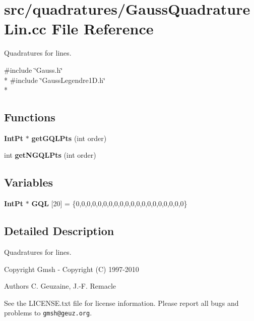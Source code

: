 \section{src/quadratures/\-Gauss\-Quadrature\-Lin.cc File Reference}
\label{GaussQuadratureLin_8cc}


Quadratures for lines.  


{\ttfamily \#include \char`\"{}Gauss.\-h\char`\"{}}\\*
{\ttfamily \#include \char`\"{}Gauss\-Legendre1\-D.\-h\char`\"{}}\\*
\subsection*{Functions}
\begin{DoxyCompactItemize}
\item 
{\bf Int\-Pt} $\ast$ {\bfseries get\-G\-Q\-L\-Pts} (int order)\label{GaussQuadratureLin_8cc_ac10710cd6e0e978c39a5e96a72d2036f}

\item 
int {\bfseries get\-N\-G\-Q\-L\-Pts} (int order)\label{GaussQuadratureLin_8cc_a79913d30c41fd4e8ca9828519704572e}

\end{DoxyCompactItemize}
\subsection*{Variables}
\begin{DoxyCompactItemize}
\item 
{\bf Int\-Pt} $\ast$ {\bfseries G\-Q\-L} [20] = \{0,0,0,0,0,0,0,0,0,0,0,0,0,0,0,0,0,0,0,0\}\label{GaussQuadratureLin_8cc_afdb9172d35be9b36d1dd885f60d001c3}

\end{DoxyCompactItemize}


\subsection{Detailed Description}
Quadratures for lines. \begin{DoxyCopyright}{Copyright}
Gmsh -\/ Copyright (C) 1997-\/2010 
\end{DoxyCopyright}
\begin{DoxyAuthor}{Authors}
C. Geuzaine, J.-\/\-F. Remacle
\end{DoxyAuthor}
See the L\-I\-C\-E\-N\-S\-E.\-txt file for license information. Please report all bugs and problems to {\tt gmsh@geuz.\-org}. 